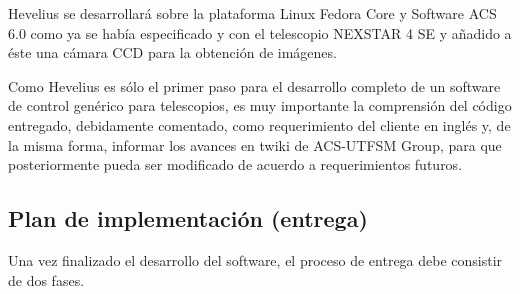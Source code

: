 \documentclass[letterpaper,titlepage,spanish,10pt]{article}
\begin{document}
Hevelius se desarrollar\'a sobre la plataforma Linux Fedora Core y Software ACS 6.0 como 
ya se hab\'ia especificado y con el telescopio NEXSTAR 4 SE y a\~nadido 
a \'este una c\'amara CCD para la obtenci\'on de im\'agenes.

Como Hevelius es s\'olo el primer paso para el desarrollo completo de un 
software de control gen\'erico para telescopios, es muy importante la 
comprensi\'on del c\'odigo entregado, debidamente comentado, como requerimiento 
del cliente en ingl\'es y, de la misma forma, informar los avances en twiki 
de ACS-UTFSM Group, para que posteriormente pueda ser modificado de acuerdo 
a requerimientos futuros.

\subsection{Plan de implementaci\'on (entrega)}
Una vez finalizado el desarrollo del software, el proceso de entrega debe 
consistir de dos fases.
\end{document}
